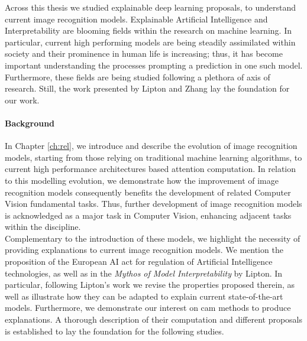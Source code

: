 \label{concs}
Across this thesis we studied explainable deep learning proposals, to understand current image 
recognition models. Explainable Artificial Intelligence and Interpretability are blooming fields 
within the research on machine learning. In particular, current high performing models are 
being steadily assimilated within society and their prominence in human life is increasing; thus, 
it has become important understanding the processes prompting a prediction in one such model. 
Furthermore, these fields are being studied following a plethora of axis of research. Still, the 
work presented by Lipton \autocite{mythos_interp} and Zhang \autocite{zhang2021survey} lay the 
foundation for our work.\\

\paragraph{Background}
\noindent In Chapter \ref{ch:rel}, we introduce and describe the evolution of image recognition 
models, starting from those relying on traditional machine learning algorithms, to current high 
performance architectures based attention computation. In relation to this modelling evolution, we 
demonstrate how the improvement of image recognition models consequently benefits the development 
of related Computer Vision fundamental tasks. Thus, further development of image recognition models 
is acknowledged as a major task in Computer Vision, enhancing adjacent tasks within the discipline.\\

\noindent Complementary to the introduction of these models, we highlight the 
necessity of providing explanations to current image recognition models. We mention the proposition  
of the European AI act for regulation of Artificial Intelligence technologies, as well as in the 
\emph{Mythos of Model Interpretability} by Lipton. In particular, following Lipton's work we 
revise the properties proposed therein, as well as illustrate how they can be adapted to explain 
current state-of-the-art models. Furthermore, we demonstrate our interest on \gls{cam} methods 
to produce explanations. A thorough description of their computation and different proposals is 
established to lay the foundation for the following studies.\\


